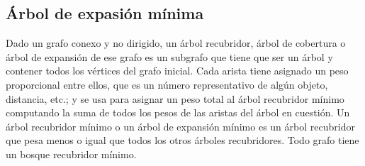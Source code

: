 \subsection{Árbol de expasión mínima}

Dado un grafo conexo y no dirigido, un árbol recubridor, árbol de cobertura o árbol de expansión de ese grafo es un subgrafo que tiene que ser un árbol y contener todos los vértices del grafo inicial. Cada arista tiene asignado un peso proporcional entre ellos, que es un número representativo de algún objeto, distancia, etc.; y se usa para asignar un peso total al árbol recubridor mínimo computando la suma de todos los pesos de las aristas del árbol en cuestión. Un árbol recubridor mínimo o un árbol de expansión mínimo es un árbol recubridor que pesa menos o igual que todos los otros árboles recubridores. Todo grafo tiene un bosque recubridor mínimo. 